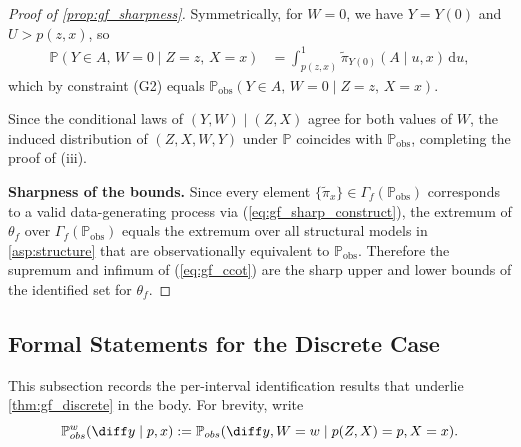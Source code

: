 \begin{proof}[Proof of \cref{prop:gf_sharpness}]
    Symmetrically, for $W = 0$, we have $Y = Y(0)$ and $U > p(z, x)$, so
    \begin{align*}
        \mathbb{P}(Y \in A,\, W = 0 \mid Z = z,\, X = x)
        &= \int_{p(z,x)}^{1} \tilde{\pi}_{Y(0)}(A \mid u, x)\, \mathrm{d}u,
    \end{align*}
    which by constraint (G2) equals $\mathbb{P}_{\text{obs}}(Y \in A,\, W = 0 \mid Z = z,\, X = x)$.

    Since the conditional laws of $(Y, W) \mid (Z, X)$ agree for both values of $W$, the induced distribution of $(Z, X, W, Y)$ under $\mathbb{P}$ coincides with $\mathbb{P}_{\text{obs}}$, completing the proof of (iii).

    \medskip
    \noindent\textbf{Sharpness of the bounds.}
    Since every element $\{\tilde{\pi}_x\} \in \Gamma_f(\mathbb{P}_{\text{obs}})$ corresponds to a valid data-generating process via (\ref{eq:gf_sharp_construct}), the extremum of $\theta_f$ over $\Gamma_f(\mathbb{P}_{\text{obs}})$ equals the extremum over all structural models in \cref{asp:structure} that are observationally equivalent to $\mathbb{P}_{\text{obs}}$. Therefore the supremum and infimum of (\ref{eq:gf_ccot}) are the sharp upper and lower bounds of the identified set for $\theta_f$.
\end{proof}

\subsection{Formal Statements for the Discrete Case}\label{subsec:proofs_gf_discrete}

This subsection records the per-interval identification results that underlie \cref{thm:gf_discrete} in the body. For brevity, write
\begin{equation}\label{eq:gf_shorthand}
    \mathbb{P}_{obs}^w(\diff y \mid p, x) := \mathbb{P}_{obs}(\diff y, W=w \mid p(Z,X) = p, X = x).
\end{equation}

